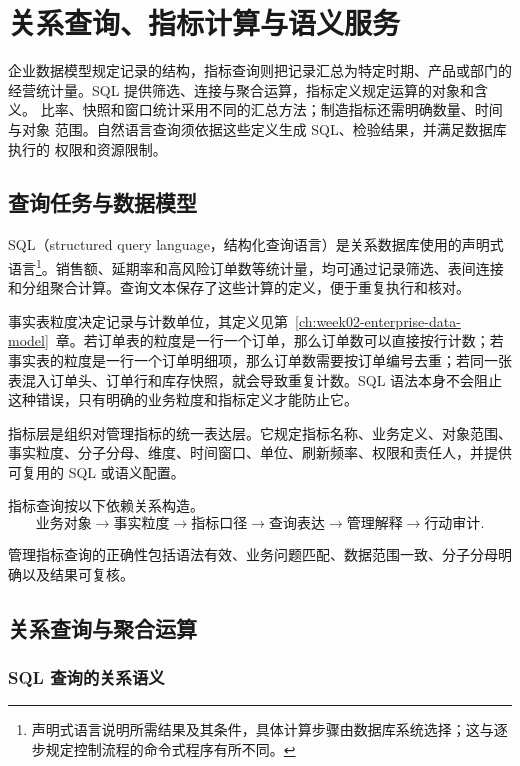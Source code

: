 \chapter{关系查询、指标计算与语义服务}
\label{ch:week03-sql-kpi}

企业数据模型规定记录的结构，指标查询则把记录汇总为特定时期、产品或部门的
经营统计量。SQL 提供筛选、连接与聚合运算，指标定义规定运算的对象和含义。
比率、快照和窗口统计采用不同的汇总方法；制造指标还需明确数量、时间与对象
范围。自然语言查询须依据这些定义生成 SQL、检验结果，并满足数据库执行的
权限和资源限制。

\section{查询任务与数据模型}

SQL（structured query language，结构化查询语言）是关系数据库使用的声明式语言\footnote{声明式语言说明所需结果及其条件，具体计算步骤由数据库系统选择；这与逐步规定控制流程的命令式程序有所不同。}。销售额、延期率和高风险订单数等统计量，均可通过记录筛选、表间连接和分组聚合计算。查询文本保存了这些计算的定义，便于重复执行和核对。

事实表粒度决定记录与计数单位，其定义见第~\ref{ch:week02-enterprise-data-model}~章。若订单表的粒度是一行一个订单，那么订单数可以直接按行计数；若事实表的粒度是一行一个订单明细项，那么订单数需要按订单编号去重；若同一张表混入订单头、订单行和库存快照，就会导致重复计数。SQL 语法本身不会阻止这种错误，只有明确的业务粒度和指标定义才能防止它。

\begin{definition}[指标层]
指标层是组织对管理指标的统一表达层。它规定指标名称、业务定义、对象范围、事实粒度、分子分母、维度、时间窗口、单位、刷新频率、权限和责任人，并提供可复用的 SQL 或语义配置。
\end{definition}

指标查询按以下依赖关系构造。
\[
\text{业务对象}
\rightarrow
\text{事实粒度}
\rightarrow
\text{指标口径}
\rightarrow
\text{查询表达}
\rightarrow
\text{管理解释}
\rightarrow
\text{行动审计}.
\]

管理指标查询的正确性包括语法有效、业务问题匹配、数据范围一致、分子分母明确以及结果可复核。

\section{关系查询与聚合运算}
\subsection{SQL 查询的关系语义}

